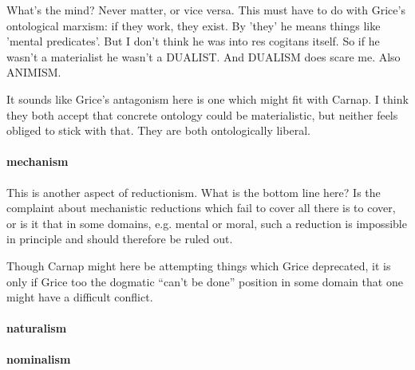 \documentclass{article}
\newcommand{\ignore}[1]{}
\begin{document}
What's the mind? Never matter, or vice versa. This must have  
to do with Grice's ontological marxism: if they work, they exist. By 'they' 
he  means things like 'mental predicates'. But I don't think he was into res 
 cogitans itself. So if he wasn't a materialist he wasn't a DUALIST. And 
DUALISM  does scare me. Also ANIMISM.

It sounds like Grice's antagonism here is one which might fit with Carnap.
I think they both accept that concrete ontology could be materialistic, but neither feels obliged to stick with that.
They are both ontologically liberal.
 
\paragraph{mechanism}

This is another aspect of reductionism.
What is the bottom line here?
Is the complaint about mechanistic reductions which fail to cover all there is to cover, or is it that in some domains, e.g. mental or moral, such a reduction is impossible in principle and should therefore be ruled out.

Though Carnap might here be attempting things which Grice deprecated, it is only if Grice too the dogmatic ``can't be done'' position in some domain that one might have a difficult conflict.
 
\paragraph{naturalism}

\ignore{
He does say that mean-N is the basis for mean-NN, so I think,  
or am pretty sure he means here a scheme that leaves VALUE out of the 
picture.  Especially concerned with the non-naturalistic basis of reason or 
rationality:  if rationality is a faculty OVER our pre-rational, natural, 
dispositions, it  cannot be "natural" herself. Etc.
} 

\paragraph{nominalism}

\ignore{
This must be a joke unless he is thinking of those ridiculous  
theories by Scheffler. Type/token Grice always used. He uses x to symbolise  
token, X to symbolise type. He may be objecting to an extensional treatment 
of  'classes'. Etc. He may be thinking of higher-order predicate-calculus 
where we  can substantivise over properties, etc. alla Strawson, Subject and 
predicate in  logic and grammar.
} 
\end{document}
